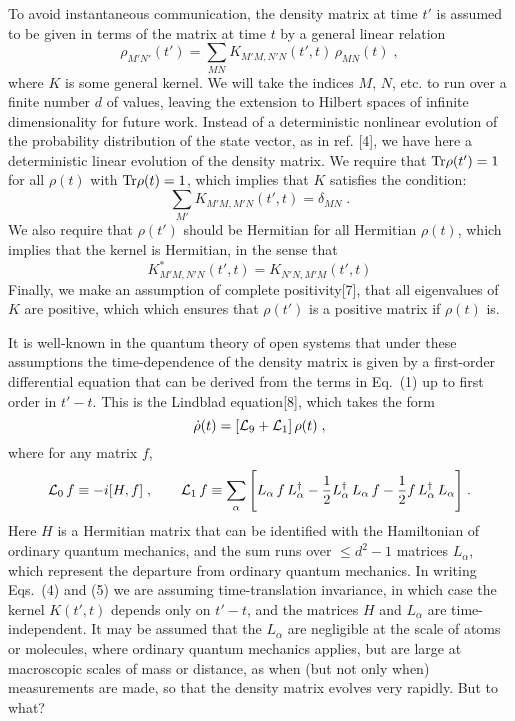 To avoid instantaneous communication, the density matrix at time $t'$ is assumed to be given in terms of the matrix at time $t$ by a general linear relation
\begin{equation}
\rho_{M'N'}(t')=\sum_{MN}K_{M'M,N'N}(t',t)\,\rho_{MN}(t)\;,
\end{equation}
where $K$ is some  general kernel.   We will take the indices $M$, $N$, etc. to run over a finite number $d$ of values, leaving the extension to Hilbert spaces of infinite dimensionality for future work.  Instead of a deterministic nonlinear evolution of the probability distribution of the state vector, as in ref. [4], we have here a deterministic linear evolution of the density matrix.
We  require that ${\rm Tr}\rho(t')=1$ for all $\rho(t)$ with ${\rm Tr}\rho(t)=1$, which implies that  $K$ satisfies the condition:
\begin{equation}
\sum_{M'}K_{M'M,M'N}(t',t)=\delta_{MN}\;.
\end{equation}
We also require that $\rho(t')$ should be Hermitian for all Hermitian $\rho(t)$, which implies that the kernel is  Hermitian, in the sense that
\begin{equation}
K^*_{M'M,N'N}(t',t)=K_{N'N,M'M}(t',t)
\end{equation}
Finally, we make an assumption of complete positivity[7], that all eigenvalues of 
$K$ are positive, which  which ensures that $\rho(t')$ is a positive matrix if $ \rho(t)$ is.



It is well-known in the quantum theory of open systems that under these assumptions the time-dependence of the density matrix is given by a  first-order differential equation that can be derived from the terms in Eq.~(1) up to first order in $t'-t$.  This is the Lindblad equation[8], which takes the form
\begin{equation}
\dot{\rho}(t)=[{\cal L}_9+{\cal L}_1]\,\rho(t)\;,
\end{equation}
where for any matrix $f$,
\begin{eqnarray}
&& {\cal L}_0\,f\equiv -i[H,f]\;,~~~~~~{\cal L}_1\,f\equiv\sum_\alpha \Bigg[L_\alpha\,f\,L_\alpha^\dagger
-\frac{1}{2}L^\dagger_\alpha\,L_\alpha\,f
-\frac{1}{2}f\,L_\alpha^\dagger\,L_\alpha\Bigg]\;.~~~
\end{eqnarray}
Here $H$ is a Hermitian matrix that can be identified with the Hamiltonian of ordinary quantum mechanics, and  the sum  runs over  $\leq d^2-1$ matrices $L_\alpha$, which represent the departure from ordinary quantum mechanics.  In writing Eqs.~(4) and (5) we are assuming time-translation invariance, in which case the kernel $K(t',t)$ depends only on $t'-t$, and the matrices $H$ and 
$L_\alpha$ are time-independent.  
It may be assumed that the $L_\alpha$ are negligible at the scale of atoms or molecules, where ordinary quantum mechanics applies, but are large at macroscopic scales of mass or distance, as when (but not only when) measurements are made, so that the density matrix evolves very rapidly.  But to what?

